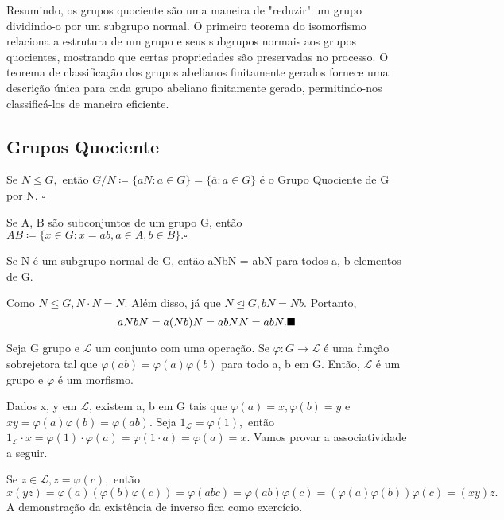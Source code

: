 \documentclass[Algebra/algebra_notes.tex]{subfiles}
\begin{document}
Resumindo, os grupos quociente s\~{a}o uma maneira de "reduzir" um grupo dividindo-o por um subgrupo normal. O primeiro teorema
do isomorfismo relaciona a estrutura de um grupo e seus subgrupos normais aos grupos quocientes, mostrando que certas
propriedades s\~{a}o preservadas no processo. O teorema de classifica\c{c}\~{a}o dos grupos abelianos finitamente gerados
fornece uma descri\c{c}\~{a}o \'{u}nica para cada grupo abeliano finitamente gerado, permitindo-nos classific\'{a}-los de
maneira eficiente.

\subsection{Grupos Quociente}
\begin{def*}
	Se $N\leq{G},$ então $G/N\coloneqq\{aN: a\in G\}=\{\overline{a}: a\in G\}$ é o Grupo Quociente de G por N. $\square$
\end{def*}
\begin{def*}
	Se A, B são subconjuntos de um grupo G, então $AB\coloneqq\{x\in G: x=ab, a\in A, b\in B\}.\square$
\end{def*}
\begin{lemma*}
	Se N é um subgrupo normal de G, então aNbN = abN para todos a, b elementos de G.
\end{lemma*}
\begin{proof*}
	Como $N\leq{G}, N \cdot N = N.$ Além disso, já que $N\trianglelefteq{G}, bN = Nb.$ Portanto,
	$$
		aNbN = a(Nb)N = abNN = abN. \text{$\blacksquare$}
	$$
\end{proof*}
\begin{lemma*}
	Seja G grupo e $\mathcal{L}$ um conjunto com uma operação. Se $\varphi:G\rightarrow \mathcal{L}$ é uma função
	sobrejetora tal que $\varphi(ab)=\varphi(a)\varphi(b)$ para todo a, b em G. Então, $\mathcal{L}$ é um grupo e $\varphi$ é
	um morfismo.
\end{lemma*}
\begin{proof*}
	Dados x, y em $\mathcal{L}$, existem a, b em G tais que $\varphi(a)=x, \varphi(b)=y$ e $xy = \varphi(a)\varphi(b)=\varphi(ab).$
	Seja $1_{\mathcal{L}}=\varphi(1),$ então $1_{\mathcal{L}}\cdot x=\varphi(1)\cdot \varphi(a) = \varphi(1 \cdot a) = \varphi(a)=x.$
	Vamos provar a associatividade a seguir.

	Se $z\in \mathcal{L}, z=\varphi(c),$ então
	$$
		x(yz)=\varphi(a)(\varphi(b)\varphi(c)) = \varphi(abc)=\varphi(ab)\varphi(c)=(\varphi(a)\varphi(b))\varphi(c) = (xy)z.
	$$
	A demonstração da existência de inverso fica como exercício. \qedsymbol
\end{proof*}
\end{document}
